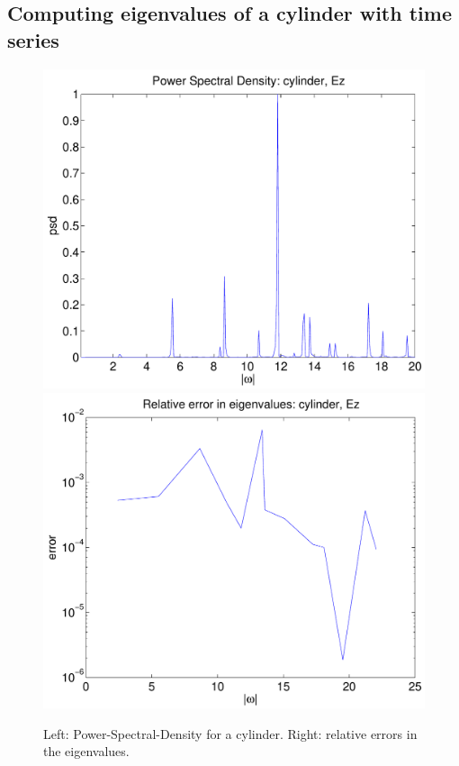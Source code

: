 \clearpage
\subsection{Computing eigenvalues of a cylinder with time series}

\renewcommand{\figWidth}{.495\linewidth}
\begin{figure}
\begin{center}
\includegraphics[width=\figWidth]{figures/psd-tube3-4-Ez}
\includegraphics[width=\figWidth]{figures/eigenValues-relErr-tube3-4-Ez}
\end{center}
\caption{Left: Power-Spectral-Density for a cylinder.
         Right: relative errors in the eigenvalues.}
\end{figure}

